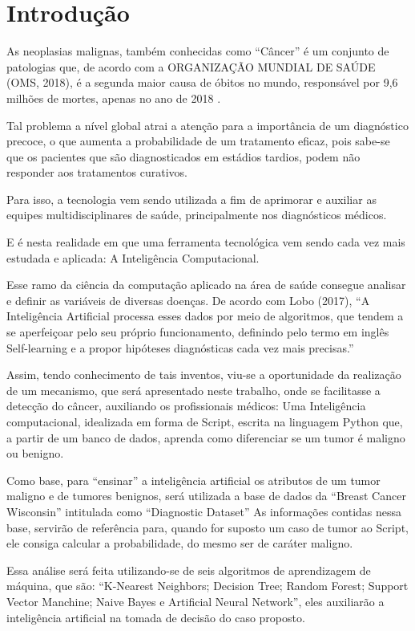 \chapter{Introdução}
\label{chapter:introducao}

As neoplasias malignas, também conhecidas como “Câncer” é um conjunto de patologias que, 
de acordo com a ORGANIZAÇÃO MUNDIAL DE SAÚDE (OMS, 2018), 
é a segunda maior causa de óbitos no mundo, 
responsável por 9,6 milhões de mortes, apenas no ano de 2018 %
.

Tal problema a nível global atrai a atenção para a importância de um diagnóstico precoce, 
o que aumenta a probabilidade de um tratamento eficaz, pois sabe-se que os pacientes que são diagnosticados em estádios tardios, 
podem não responder aos tratamentos curativos.

Para isso, a tecnologia vem sendo utilizada a fim de aprimorar e auxiliar as equipes multidisciplinares de saúde, 
principalmente nos diagnósticos médicos.

E é nesta realidade em que uma ferramenta tecnológica vem sendo cada vez mais estudada e aplicada: 
A Inteligência Computacional.

Esse ramo da ciência da computação aplicado na área de saúde consegue analisar e definir as variáveis de diversas doenças. 
De acordo com Lobo (2017), “A Inteligência Artificial processa esses dados por meio de algoritmos, 
que tendem a se aperfeiçoar pelo seu próprio funcionamento, 
definindo pelo termo em inglês Self-learning e a propor hipóteses diagnósticas cada vez mais precisas.”

Assim, tendo conhecimento de tais inventos, viu-se a oportunidade da realização de um mecanismo, 
que será apresentado neste trabalho, onde se facilitasse a detecção do câncer, auxiliando os profissionais médicos: 
Uma Inteligência computacional, idealizada em forma de Script, escrita na linguagem Python que, 
a partir de um banco de dados, aprenda como diferenciar se um tumor é maligno ou benigno.

Como base, para “ensinar” a inteligência artificial os atributos de um tumor maligno e de tumores benignos, 
será utilizada a base de dados da “Breast Cancer Wisconsin” intitulada como “Diagnostic Dataset” As informações contidas nessa base, 
servirão de referência para, quando for suposto um caso de tumor ao Script, ele consiga calcular a probabilidade, 
do mesmo ser de caráter maligno.

Essa análise será feita utilizando-se de seis algoritmos de aprendizagem de máquina, que são: “K-Nearest Neighbors; 
Decision Tree; Random Forest; Support Vector Manchine; Naive Bayes e Artificial Neural Network”, eles auxiliarão a inteligência artificial na tomada de decisão do caso proposto.


















